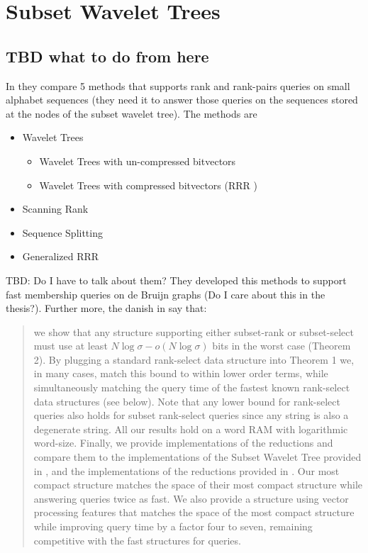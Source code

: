 
\chapter{Subset Wavelet Trees}
\label{ch:Chapter4}







\clearpage
\section{TBD what to do from here}
In \cite{SubsetWT} they compare 5 methods that supports rank and rank-pairs queries on small alphabet sequences (they need it to answer those queries on the sequences stored at the nodes of the subset wavelet tree). The methods are
\begin{itemize}
    \item Wavelet Trees
          \begin{itemize}
              \item Wavelet Trees with un-compressed bitvectors
              \item Wavelet Trees with compressed bitvectors (RRR \cite{RRR2002})
          \end{itemize}
    \item Scanning Rank
    \item Sequence Splitting
    \item Generalized RRR
\end{itemize}
TBD: Do I have to talk about them? They developed this methods to support fast membership queries on de Bruijn graphs (Do I care about this in the thesis?). Further more, the danish in \cite{bille2023rank} say that:
\begin{quote}
    we show that any structure supporting either subset-rank or subset-select must use at least $N \log \sigma - o(N \log \sigma)$ bits in the worst case (Theorem 2). By plugging a standard rank-select data structure into Theorem 1 we, in many cases, match this bound to within lower order terms, while simultaneously matching the query time of the fastest known rank-select data structures (see below). Note that any lower bound for rank-select queries also holds for subset rank-select queries since any string is also a degenerate string. All our results hold on a word RAM with logarithmic word-size. Finally, we provide implementations of the reductions and compare them to the implementations of the Subset Wavelet Tree provided in \cite{SubsetWT}, and the implementations of the reductions provided in \cite{alanko2023small}. Our most compact structure matches the space of their most compact structure while answering queries twice as fast. We also provide a structure using vector processing features that matches the space of the most compact structure while improving query time by a factor four to seven, remaining competitive with the fast structures for queries.
\end{quote}
